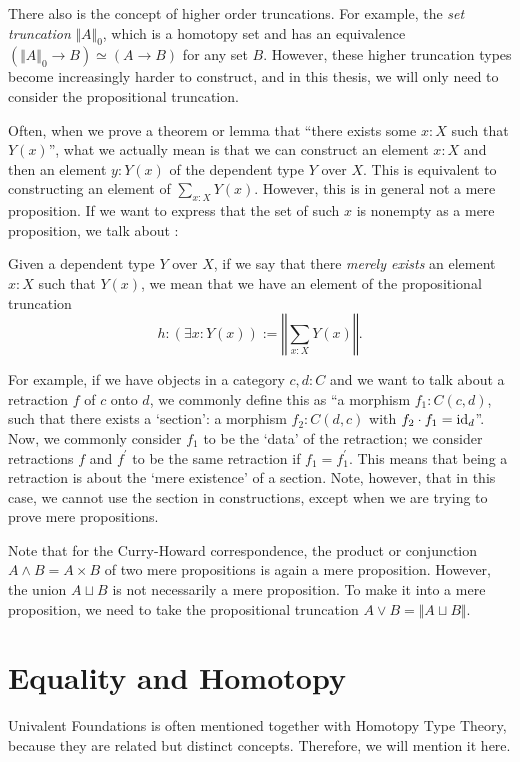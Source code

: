 There also is the concept of higher order truncations. For example, the \textit{set truncation} $ \Vert A \Vert_0 $, which is a homotopy set and has an equivalence $ (\Vert A \Vert_0 \to B) \simeq (A \to B) $ for any set $ B $. However, these higher truncation types become increasingly harder to construct, and in this thesis, we will only need to consider the propositional truncation.

Often, when we prove a theorem or lemma that ``there exists some $ x: X $ such that $ Y(x) $'', what we actually mean is that we can construct an element $ x: X $ and then an element $ y : Y(x) $ of the dependent type $ Y $ over $ X $. This is equivalent to constructing an element of $ \sum_{x: X} Y(x) $. However, this is in general not a mere proposition. If we want to express that the set of such $ x $ is nonempty as a mere proposition, we talk about :
\begin{definition}\label{def:mere-existence}
  Given a dependent type $ Y $ over $ X $, if we say that there \textit{merely exists} an element $ x: X $ such that $ Y(x) $, we mean that we have an element of the propositional truncation
  \[ h: \left(\exists x: Y(x)\right) := \left\Vert \sum_{x: X} Y(x) \right\Vert. \]
\end{definition}

For example, if we have objects in a category $ c, d: C $ and we want to talk about a retraction $ f $ of $ c $ onto $ d $, we commonly define this as ``a morphism $ f_1: C(c, d) $, such that there exists a `section': a morphism $ f_2: C(d, c) $ with $ f_2 \cdot f_1 = \text{id}_{d} $''. Now, we commonly consider $ f_1 $ to be the `data' of the retraction; we consider retractions $ f $ and $ f^\prime $ to be the same retraction if $ f_1 = f^\prime_1 $. This means that being a retraction is about the `mere existence' of a section. Note, however, that in this case, we cannot use the section in constructions, except when we are trying to prove mere propositions.

Note that for the Curry-Howard correspondence, the product or conjunction $ A \land B = A \times B $ of two mere propositions is again a mere proposition. However, the union $ A \sqcup B $ is not necessarily a mere proposition. To make it into a mere proposition, we need to take the propositional truncation $ A \lor B = \Vert A \sqcup B \Vert $.

\section{Equality and Homotopy}
Univalent Foundations is often mentioned together with Homotopy Type Theory, because they are related but distinct concepts. Therefore, we will mention it here.

